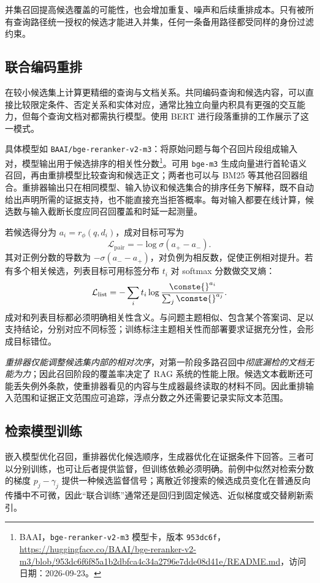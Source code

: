 \documentclass[../textbook.tex]{subfiles}
\begin{document}
并集召回提高候选覆盖的可能性，也会增加重复、噪声和后续重排成本。只有被所有查询路径统一授权的候选才能进入并集，任何一条备用路径都受同样的身份过滤约束。

\subsection{联合编码重排}
在较小候选集上计算更精细的查询与文档关系。共同编码查询和候选内容，可以直接比较限定条件、否定关系和实体对应，通常比独立向量内积具有更强的交互能力，但每个查询文档对都需执行模型。使用 BERT 进行段落重排的工作展示了这一模式。\cite{nogueira2019reranking}

具体模型如 \texttt{BAAI/bge-reranker-v2-m3}：将原始问题与每个召回片段组成输入对，模型输出用于候选排序的相关性分数\footnote{BAAI，\texttt{bge-reranker-v2-m3} 模型卡，版本 \texttt{953dc6f}，\url{https://huggingface.co/BAAI/bge-reranker-v2-m3/blob/953dc6f6f85a1b2dbfca4c34a2796e7dde08d41e/README.md}，访问日期：2026-09-23。}。可用 \texttt{bge-m3} 生成向量进行首轮语义召回，再由重排模型比较查询和候选正文；两者也可以与 BM25 等其他召回器组合。重排器输出只在相同模型、输入协议和候选集合的排序任务下解释，既不自动给出声明所需的证据支持，也不能直接充当拒答概率。每对输入都要在线计算，候选数与输入截断长度应同召回覆盖和时延一起测量。

若候选得分为 $a_i=r_\phi(q,d_i)$，成对目标可写为
\begin{equation}
 \mathcal L_{\mathrm{pair}}=-\log\sigma(a_+-a_-).
\end{equation}
其对正例分数的导数为 $-\sigma(a_--a_+)$，对负例为相反数，促使正例相对提升。若有多个相关候选，列表目标可用标签分布 $t_i$ 对 softmax 分数做交叉熵：
\begin{equation}
 \mathcal L_{\mathrm{list}}=-\sum_i t_i\log\frac{\conste{}^{a_i}}{\sum_j \conste{}^{a_j}}.
\end{equation}
成对和列表目标都必须明确相关性含义。与问题主题相似、包含某个答案词、足以支持结论，分别对应不同标签；训练标注主题相关性而部署要求证据充分性，会形成目标错位。

\emph{重排器仅能调整候选集内部的相对次序}，对第一阶段多路召回中\emph{彻底漏检的文档无能为力}；因此召回阶段的覆盖率决定了 RAG 系统的性能上限。候选文本截断还可能丢失例外条款，使重排器看见的内容与生成器最终读取的材料不同。因此重排输入范围和证据正文范围应可追踪，浮点分数之外还需要记录实际文本范围。

\subsection{检索模型训练}
嵌入模型优化召回，重排器优化候选顺序，生成器优化在证据条件下回答。三者可以分别训练，也可让后者提供监督，但训练依赖必须明确。前例中似然对检索分数的梯度 $p_j-\gamma_j$ 提供一种候选监督信号；离散近邻搜索的候选成员变化在普通反向传播中不可微，因此“联合训练”通常还是回归到固定候选、近似梯度或交替刷新索引。
\end{document}
